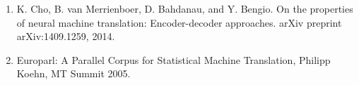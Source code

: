 \documentclass[letterpaper, 11pt]{article}
\begin{document}
\begin{multicols}{2}
\begin{enumerate}
\item K. Cho, B. van Merrienboer, D. Bahdanau, and Y. Bengio. On the properties of neural machine translation: Encoder-decoder approaches. arXiv preprint arXiv:1409.1259, 2014.

\item Europarl: A Parallel Corpus for Statistical Machine Translation, Philipp Koehn, MT Summit 2005.
\end{enumerate}

\end{multicols}
\end{document}
